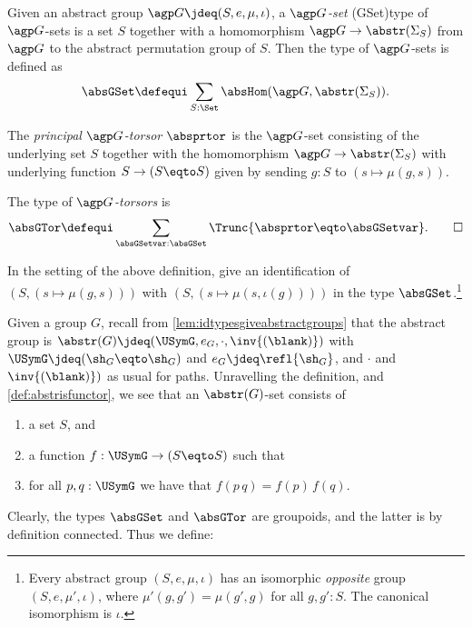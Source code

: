 \begin{definition}
\label{def:abstrGtorsors}
Given an abstract group ${\agp G}\jdeq(S,e,\mu,\iota)$, a \emph{$\agp G$-set}%
\glossary(GSet){\protect{$\absGSet$}}{type of $\agp G$-sets}
is a set $S$ together with a homomorphism
$\agp G\to\abstr(\Sigma_S)$
from $\agp G$ to the abstract permutation group of $S$.
Then the type of $\agp G$-sets is defined as 
$$\absGSet\defequi \sum_{S:\Set}\absHom({\agp G},\abstr(\Sigma_{S})).$$

The \emph{principal ${\agp G}$-torsor} $\absprtor$ is the 
${\agp G}$-set consisting of the underlying set $S$ together with 
the homomorphism ${\agp G}\to\abstr(\Sigma_{S})$ with underlying 
function $S\to (S\eqto S)$ given by sending $g:S$ to $(s\mapsto \mu(g,s))$.

The type of \emph{${\agp G}$-torsors} is
\[
\absGTor\defequi\sum_{\absGSetvar:\absGSet}
  \Trunc{\absprtor \eqto \absGSetvar}.\qedhere
\]
\end{definition}

\begin{xca}\label{xca:absprtorsor}
In the setting of the above definition,
give an identification of $(S,(s\mapsto \mu(g,s)))$ with
$(S,(s\mapsto \mu(s,\iota(g))))$
in the type $\absGSet$.\footnote{Every abstract group $(S,e,\mu,\iota)$
has an isomorphic \emph{opposite} group $(S,e,\mu',\iota)$, where
$\mu'(g,g')=\mu(g',g)$ for all $g,g':S$. 
The canonical isomorphism is $\iota$.}
\end{xca}

\begin{example}
  Given a group $G$, recall from \cref{lem:idtypesgiveabstractgroups}
  that the abstract group is 
  $\abstr(G)\jdeq(\USymG,e_G,\cdot,\inv{(\blank)})$ 
  with $\USymG\jdeq(\sh_G\eqto\sh_G)$ and $e_G\jdeq\refl{\sh_G}$,
  and $\cdot$ and $\inv{(\blank)})$ as usual for paths.
  Unravelling the definition, and \cref{def:abstrisfunctor},
  we see that an $\abstr(G)$-set consists of
  \begin{enumerate}
  \item a set $S$, and
  \item a function $f:\USymG\to (S\eqto S)$ such that
  \item for all $p,q:\USymG$ we have that $f(p\, q)=f(p)\,f(q)$.\qedhere
  \end{enumerate}
\end{example}

Clearly, the types $\absGSet$ and $\absGTor$ are groupoids,
and the latter is by definition connected. Thus we define:

